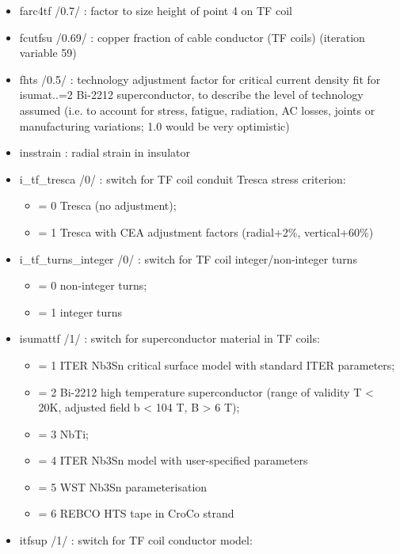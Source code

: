 \documentclass[]{article}
\providecommand{\tightlist}{%
  \setlength{\itemsep}{0pt}\setlength{\parskip}{0pt}}
\begin{document}
\begin{itemize}
\item
  farc4tf /0.7/ : factor to size height of point 4 on TF coil
\item
  fcutfsu /0.69/ : copper fraction of cable conductor (TF coils)
  (iteration variable 59)
\item
  fhts /0.5/ : technology adjustment factor for critical current density
  fit for isumat..=2 Bi-2212 superconductor, to describe the level of
  technology assumed (i.e. to account for stress, fatigue, radiation, AC
  losses, joints or manufacturing variations; 1.0 would be very
  optimistic)
\item
  insstrain : radial strain in insulator
\item
  i\_tf\_tresca /0/ : switch for TF coil conduit Tresca stress
  criterion:

  \begin{itemize}
  \tightlist
  \item
    = 0 Tresca (no adjustment);
  \item
    = 1 Tresca with CEA adjustment factors (radial+2\%, vertical+60\%)
  \end{itemize}
\item
  i\_tf\_turns\_integer /0/ : switch for TF coil integer/non-integer
  turns

  \begin{itemize}
  \tightlist
  \item
    = 0 non-integer turns;
  \item
    = 1 integer turns
  \end{itemize}
\item
  isumattf /1/ : switch for superconductor material in TF coils:

  \begin{itemize}
  \tightlist
  \item
    = 1 ITER Nb3Sn critical surface model with standard ITER parameters;
  \item
    = 2 Bi-2212 high temperature superconductor (range of validity T
    \textless{} 20K, adjusted field b \textless{} 104 T, B
    \textgreater{} 6 T);
  \item
    = 3 NbTi;
  \item
    = 4 ITER Nb3Sn model with user-specified parameters
  \item
    = 5 WST Nb3Sn parameterisation
  \item
    = 6 REBCO HTS tape in CroCo strand
  \end{itemize}
\item
  itfsup /1/ : switch for TF coil conductor model:


\end{itemize}
\end{document}
